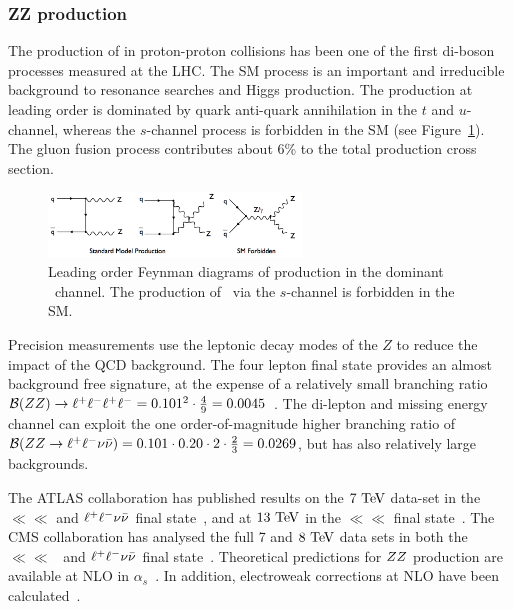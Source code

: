 \subsubsection{ZZ production}
\label{sss-ZZprod}

The production of \ZZ in proton-proton collisions has been one of the first di-boson 
processes measured at the LHC. The SM process is an important and irreducible
background to resonance searches and Higgs production. The production at leading
order is dominated by quark anti-quark annihilation in the $t$ and $u$-channel,
whereas the $s$-channel process is forbidden in the SM 
(see Figure~\ref{fig:sss-ZZprod-LOdiagrams}). The gluon fusion process 
contributes about 6\% to the total production cross section. 

\begin{figure}[htbp]
  \begin{center}
  \includegraphics[width=0.6\textwidth]{figures/sss-inclboson-diboson-zzprod-zzdiagram.png}
  \caption{Leading order Feynman diagrams of \ZZ production in the dominant 
  \qqbar\ channel. The production of \ZZ\ via the $s$-channel is forbidden in the SM.}
\label{fig:sss-ZZprod-LOdiagrams}
\end{center}
\end{figure}

Precision measurements use the leptonic decay modes of the $Z$ to reduce the impact of
the QCD background. 
The four lepton final state provides an almost background free signature, at the
expense of a relatively small branching ratio
$\mathcal{B}(ZZ) \to \ll\ll = 0.101^2 \cdot {4 \over 9} = 0.0045$~\cite{Agashe:2014kda}.  
The di-lepton and missing energy channel can exploit the one order-of-magnitude
higher branching ratio of 
$\mathcal{B}(\ZZ \to \ll\vv) = 0.101 \cdot 0.20 \cdot 2 \cdot {2 \over 3} = 0.0269$, 
but has also relatively large backgrounds.

The ATLAS collaboration has published results on the $7\TeV$ data-set 
in the $\ll\ll$ and $\ll\vv$ final state~\cite{Aad:2012awa}, and at
$13\TeV$ in the $\ll\ll$ final state~\cite{Aad:2015zqe}. The CMS collaboration
has analysed the full 7 and $8\TeV$ data sets in both 
the $\ll\ll$~\cite{Chatrchyan:2012sga,CMS:2014xja} and 
$\ll\vv$ final state~\cite{Khachatryan:2015pba}.
Theoretical predictions for $\ZZ$ production are available 
at NLO in $\alpha_s$~\cite{Campbell:2011bn}. In addition, electroweak 
corrections at NLO have been calculated~\cite{Bierweiler:2013dja,Baglio:2013toa}. 

